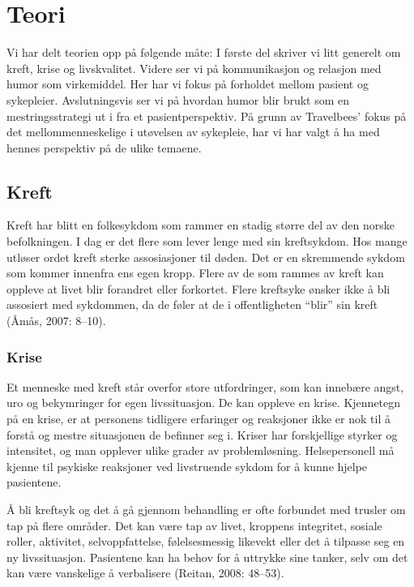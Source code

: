 \chapter{Teori}

Vi har delt teorien opp på følgende måte: I første del skriver vi litt generelt
om kreft, krise og livskvalitet. Videre ser vi på kommunikasjon og relasjon med
humor som virkemiddel. Her har vi fokus på forholdet mellom pasient og
sykepleier. Avslutningsvis ser vi på hvordan humor blir brukt som en
mestringsstrategi ut i fra et pasientperspektiv. På grunn av Travelbees' fokus
på det mellommenneskelige i utøvelsen av sykepleie, har vi har valgt å ha med
hennes perspektiv på de ulike temaene.

\section{Kreft}

Kreft har blitt en folkesykdom som rammer en stadig større del av den norske
befolkningen.  I dag er det flere som lever lenge med sin kreftsykdom. Hos
mange utløser ordet kreft sterke assosiasjoner til døden. Det er en skremmende
sykdom som kommer innenfra ens egen kropp. Flere av de som rammes av kreft kan
oppleve at livet blir forandret eller forkortet. Flere kreftsyke ønsker ikke å
bli assosiert med sykdommen, da de føler at de i offentligheten “blir” sin
kreft (Åmås, 2007: 8--10).

\subsection{Krise}

Et menneske med kreft står overfor store utfordringer, som kan innebære angst,
uro og bekymringer for egen livssituasjon. De kan oppleve en krise. Kjennetegn
på en krise, er at personens tidligere erfaringer og reaksjoner ikke er nok til
å forstå og mestre situasjonen de befinner seg i. Kriser har forskjellige
styrker og intensitet, og man opplever ulike grader av problemløsning.
Helsepersonell må kjenne til psykiske reaksjoner ved livstruende sykdom for å
kunne hjelpe pasientene.

Å bli kreftsyk og det å gå gjennom behandling er ofte forbundet med trusler om
tap på flere områder. Det kan være tap av livet, kroppens integritet, sosiale
roller, aktivitet, selvoppfattelse, følelsesmessig likevekt eller det å
tilpasse seg en ny livssituasjon. Pasientene kan ha behov for å uttrykke sine
tanker, selv om det kan være vanskelige å verbalisere (Reitan, 2008: 48--53).

